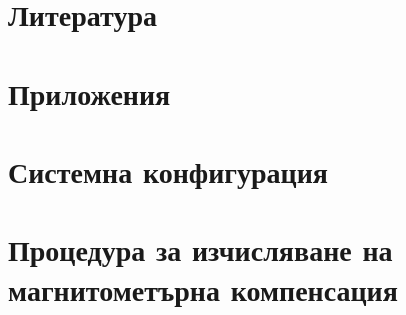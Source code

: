 \def\documentauthorname         {Рафаел Динев Калъчев}
\def\documentauthoremail        {kalachev.rafael@gmail.com}
\def\documenttitle              {Платформа за безпилотен летателен апарат с четири ротора}
\def\documenttitleshort         {Платформа за безпилотен летателен апарат}
\def\documentsubject            {}
\def\documentkeywords           {embeded,quadrotor,automation,microcontroller,control,drone}
\def\documenttype               {Дипломна работа}
\def\documentlocation           {Технически Университет София}


\setlength{\parindent}{.5em}
\setlength{\parskip}{1.5em}
\linespread{1.5}







\tableofcontents
\listoffigures
\newpage









\newpage
\section{Литература}



\newpage
\section*{Приложения}

\begin{appendix}
    \section{Системна конфигурация}

    

    \section{Процедура за изчисляване на магнитометърна компенсация}
    
\end{appendix}


